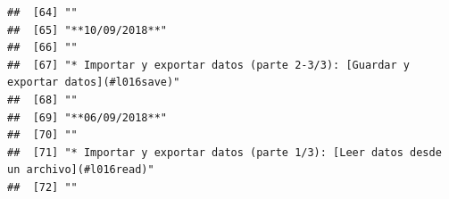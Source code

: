 \documentclass[
]{book}
\begin{document}
\begin{verbatim}
##  [64] ""                                                                                                                                                                                                                                                                                                        
##  [65] "**10/09/2018**"                                                                                                                                                                                                                                                                                          
##  [66] ""                                                                                                                                                                                                                                                                                                        
##  [67] "* Importar y exportar datos (parte 2-3/3): [Guardar y exportar datos](#l016save)"                                                                                                                                                                                                                        
##  [68] ""                                                                                                                                                                                                                                                                                                        
##  [69] "**06/09/2018**"                                                                                                                                                                                                                                                                                          
##  [70] ""                                                                                                                                                                                                                                                                                                        
##  [71] "* Importar y exportar datos (parte 1/3): [Leer datos desde un archivo](#l016read)"                                                                                                                                                                                                                       
##  [72] ""                                                                                                                                                                                                                                                                                                        

\end{verbatim}
\end{document}
